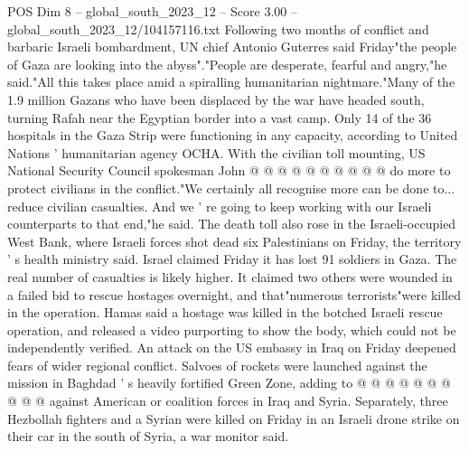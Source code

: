 \begin{textsample}{POS Dim 8 – global\_south\_2023\_12 – Score 3.00 – global\_south\_2023\_12/104157116.txt}
Following two months of conflict and barbaric Israeli bombardment, UN chief Antonio Guterres said Friday"the people of Gaza are looking into the abyss"."People are desperate, fearful and angry,"he said."All this takes place amid a spiralling humanitarian nightmare."Many of the 1.9 million Gazans who have been displaced by the war have headed south, turning Rafah near the Egyptian border into a vast camp.
Only 14 of the 36 hospitals in the Gaza Strip were functioning in any capacity, according to United Nations ' humanitarian agency OCHA.
With the civilian toll mounting, US National Security Council spokesman John @ @ @ @ @ @ @ @ @ @ do more to protect civilians in the conflict."We certainly all recognise more can be done to... reduce civilian casualties.
And we ' re going to keep working with our Israeli counterparts to that end,"he said.
The death toll also rose in the Israeli-occupied West Bank, where Israeli forces shot dead six Palestinians on Friday, the territory ' s health ministry said.
Israel claimed Friday it has lost 91 soldiers in Gaza.
The real number of casualties is likely higher.
It claimed two others were wounded in a failed bid to rescue hostages overnight, and that"numerous terrorists"were killed in the operation.
Hamas said a hostage was killed in the botched Israeli rescue operation, and released a video purporting to show the body, which could not be independently verified.
An attack on the US embassy in Iraq on Friday deepened fears of wider regional conflict.
Salvoes of rockets were launched against the mission in Baghdad ' s heavily fortified Green Zone, adding to @ @ @ @ @ @ @ @ @ @ against American or coalition forces in Iraq and Syria.
Separately, three Hezbollah fighters and a Syrian were killed on Friday in an Israeli drone strike on their car in the south of Syria, a war monitor said.

\end{textsample}
